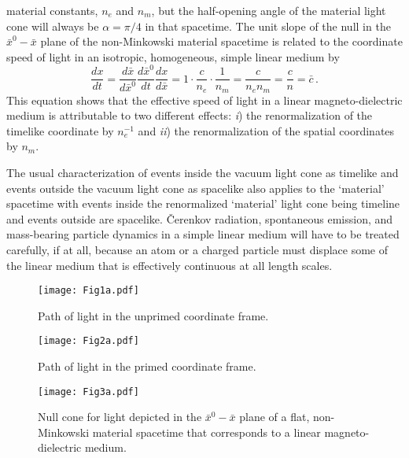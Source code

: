 \documentclass[twocolumn,amssymb,eqsecnum,aps,pra]{revtex4-2}
\begin{document}
material constants, $n_e$ and $n_m$, but the half-opening angle of the
material light cone will always be $\alpha=\pi/4$ in that spacetime.
The unit slope of the null in the $\bar x^0-\bar x$ plane of the
non-Minkowski material spacetime is related to the coordinate speed of
light in an isotropic, homogeneous, simple linear medium by
\begin{equation}
\frac{d x}{d t}=
\frac{d\bar x}{d\bar x^0}
\frac{d\bar x^0}{dt}
\frac{dx}{d\bar x} =
1\cdot\frac{c}{n_e}\cdot\frac{1}{n_m} =\frac{c}{n_en_m}
=\frac{c}{n} =\bar c \, .
\label{EQq7.04}
\end{equation}
This equation shows that the effective speed of light in a
linear magneto-dielectric medium is attributable to two different
effects:
{\it i}) the renormalization of the timelike coordinate by $n_e^{-1}$
and {\it ii}) the renormalization of the spatial coordinates by $n_m$.
\par
The usual characterization of events inside the vacuum light cone as
timelike and events outside the vacuum light cone as spacelike also 
applies to the `material' spacetime with events inside the renormalized
`material' light cone being timeline and events outside are spacelike.
\v{C}erenkov radiation, spontaneous emission, and mass-bearing particle
dynamics in a simple linear medium will have to be treated carefully,
if at all, because an atom or a charged particle must displace some
of the linear medium that is effectively continuous at all length
scales.
\par
\begin{figure}
\texttt{[image: Fig1a.pdf]}
\caption{Path of light in the unprimed coordinate frame.}
\end{figure}
\begin{figure}
\texttt{[image: Fig2a.pdf]}
\caption{Path of light in the primed coordinate frame.}
\end{figure}
\par
\begin{figure}
\texttt{[image: Fig3a.pdf]}
\caption{Null cone for light depicted in the $\bar x^0-\bar x$ plane
of a flat, non-Minkowski material spacetime that corresponds to a
linear magneto-dielectric medium.}
\end{figure}
\par
\end{document}
